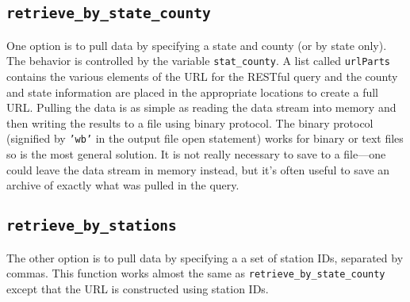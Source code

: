 \documentclass[12pt]{article}
\begin{document}
\subsection{\texttt{retrieve\_by\_state\_county}}
One option is to pull data by specifying a state and county (or by state only). The behavior is controlled by the variable \texttt{stat\_county}. A list called \texttt{urlParts} contains the various elements of the URL for the RESTful query and the county and state information are placed in the appropriate locations to create a full URL. Pulling the data is as simple as reading the data stream into memory and then writing the results to a file using binary protocol. The binary protocol (signified by \texttt{'wb'} in the output file open statement) works for binary or text files so is the most general solution. It is not really necessary to save to a file---one could leave the data stream in memory instead, but it's often useful to save an archive of exactly what was pulled in the query.
\begin{center}
	
\end{center}

\subsection{\texttt{retrieve\_by\_stations}}
The other option is to pull data by specifying a a set of station IDs, separated by commas. This function works almost the same as \texttt{retrieve\_by\_state\_county} except that the URL is constructed using station IDs.
\begin{center}
	
\end{center}
\end{document}
